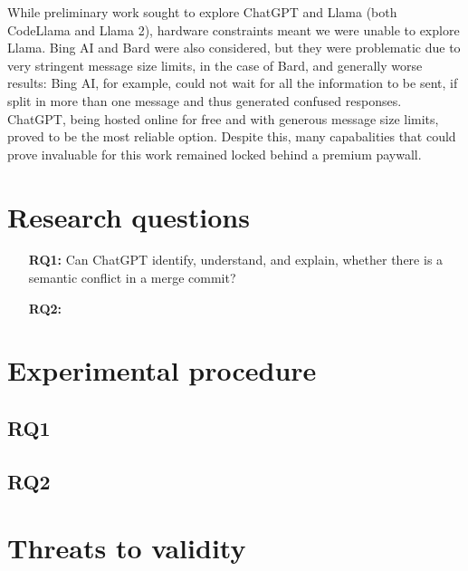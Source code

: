
While preliminary work sought to explore ChatGPT and Llama (both CodeLlama and Llama 2), hardware constraints meant we were unable to explore Llama. Bing AI and Bard were also considered, but they were problematic due to very stringent message size limits, in the case of Bard, and generally worse results: Bing AI, for example, could not wait for all the information to be sent, if split in more than one message and thus generated confused responses. ChatGPT, being hosted online for free and with generous message size limits, proved to be the most reliable option. Despite this, many capabalities that could prove invaluable for this work remained locked behind a premium paywall.


\section{Research questions}

\begin{itemize}
  \item[\textbf{RQ1:}] Can ChatGPT identify, understand, and explain, whether
  there is a semantic conflict in a merge commit?

  \item[\textbf{RQ2:}] 
\end{itemize}

\section{Experimental procedure}

\subsection{RQ1}


\subsection{RQ2}



\section{Threats to validity}

